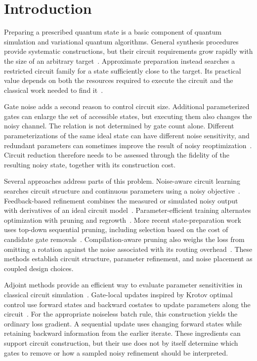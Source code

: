 \section{Introduction}
\label{sec:introduction}

Preparing a prescribed quantum state is a basic component of quantum
simulation and variational quantum algorithms. General synthesis procedures
provide systematic constructions, but their circuit requirements grow rapidly
with the size of an arbitrary target~\cite{Mottonen2005,Plesch2011}.
Approximate preparation instead searches a restricted circuit family for a
state sufficiently close to the target. Its practical value depends on both
the resources required to execute the circuit and the classical work needed
to find it~\cite{Cerezo2021}.

Gate noise adds a second reason to control circuit size. Additional
parameterized gates can enlarge the set of accessible states, but executing
them also changes the noisy channel. The relation is not determined by gate
count alone. Different parameterizations of the same ideal state can have
different noise sensitivity, and redundant parameters can sometimes improve
the result of noisy reoptimization~\cite{Fontana2021}. Circuit reduction
therefore needs to be assessed through the fidelity of the resulting noisy
state, together with its construction cost.

Several approaches address parts of this problem. Noise-aware circuit
learning searches circuit structure and continuous parameters using a noisy
objective~\cite{Cincio2021}. Feedback-based refinement combines the measured
or simulated noisy output with derivatives of an ideal circuit
model~\cite{RobustState2024}. Parameter-efficient training alternates
optimization with pruning and regrowth~\cite{Sim2021PECT}. More recent
state-preparation work uses top-down sequential pruning, including selection
based on the cost of candidate gate removals~\cite{Ashfaq2026}.
Compilation-aware pruning also weighs the loss from omitting a rotation
against the noise associated with its routing overhead~\cite{Escofet2026}.
These methods establish circuit structure, parameter refinement, and noise
placement as coupled design choices.

Adjoint methods provide an efficient way to evaluate parameter sensitivities
in classical circuit simulation~\cite{JonesGacon2020}. Gate-local updates
inspired by Krotov optimal control use forward states and backward costates
to update parameters along the circuit~\cite{Goerz2019,Froehlich2026HybridKrotov}.
For the appropriate noiseless batch rule, this construction yields the
ordinary loss gradient. A sequential update uses changing forward states
while retaining backward information from the earlier iterate. These
ingredients can support circuit construction, but their use does not by
itself determine which gates to remove or how a sampled noisy refinement
should be interpreted.

